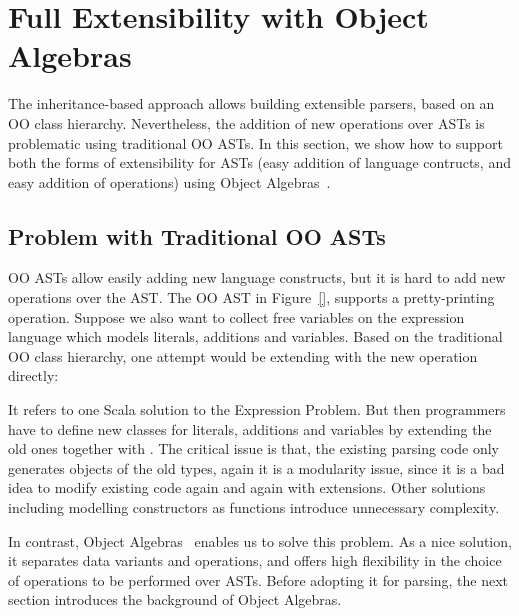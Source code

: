 \section{Full Extensibility with Object Algebras}\label{sec:algebrasandparsing}

The inheritance-based approach allows building extensible parsers, based on an OO class hierarchy.  Nevertheless, the addition of new operations over ASTs is problematic using traditional OO ASTs. In this section, we 
show how to support both the forms of extensibility for ASTs (easy 
addition of language contructs, and easy addition of operations)
using Object Algebras~\cite{}.

\subsection{Problem with Traditional OO ASTs}\label{subsec:problemwithoutoa}

OO ASTs allow easily adding new language constructs, but it is hard 
to add new operations over the AST. The OO AST in Figure~\ref{}, 
supports a pretty-printing operation. Suppose we also want to collect free variables on the expression language which models
literals, additions and variables. Based on the traditional OO class hierarchy, one attempt would be extending  with the new
operation directly:


It refers to one Scala solution to the Expression Problem. But then programmers have to define new classes for literals, additions and variables
by extending the old ones together with . The critical issue is that, the existing parsing code only generates objects of the old
types, again it is a modularity issue, since it is a bad idea to modify existing code again and again with extensions. Other solutions including modelling constructors as functions introduce unnecessary complexity.

In contrast, Object Algebras~\cite{Oliveira2012} enables us to solve this problem. As a nice solution, it separates data variants
and operations, and offers high flexibility in the choice of operations to be performed over ASTs. Before adopting it for parsing, the next section introduces the background of Object Algebras.

